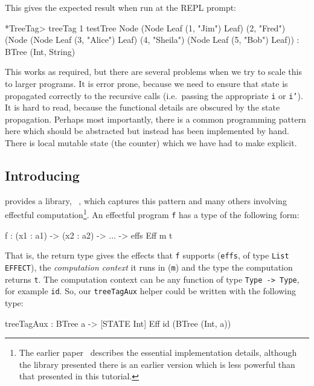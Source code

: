 \noindent
This gives the expected result when run at the \Idris{} REPL prompt:

\begin{code}
*TreeTag> treeTag 1 testTree 
Node (Node Leaf (1, "Jim") Leaf)
     (2, "Fred")
     (Node (Node Leaf (3, "Alice") Leaf)
           (4, "Sheila")
           (Node Leaf (5, "Bob") Leaf)) : BTree (Int, String)
\end{code}

\noindent
This works as required, but there are several problems when we try to scale this to larger programs.
It is error prone, because we need to ensure that state is propagated correctly to the recursive calls (i.e.\ passing the appropriate \texttt{i} or \texttt{i'}).
It is hard to read, because the functional details are obscured by the state propagation.
Perhaps most importantly, there is a common programming pattern here which should be abstracted but instead has been implemented by hand.
There is local mutable state (the counter) which we have had to make explicit.

\subsection{Introducing \effects{}}

\Idris{} provides a library, \effects{}~\cite{brady-icfp2013}, which captures this pattern and many others involving effectful computation\footnote{The earlier paper~\cite{brady-icfp2013} describes the essential implementation details, although the library presented there is an earlier version which is less powerful than that presented in this tutorial.}.
An effectful program \texttt{f} has a type of the following form:

\begin{code}
f : (x1 : a1) -> (x2 : a2) -> ... -> { effs } Eff m t
\end{code}

\noindent
That is, the return type gives the effects that \texttt{f} supports (\texttt{effs}, of type \texttt{List EFFECT}),  the \emph{computation context} it runs in (\texttt{m}) and the type the computation returns \texttt{t}.
The computation context can be any function of type \texttt{Type -> Type}, for example \texttt{id}.
So, our \texttt{treeTagAux} helper could be written with the following type:

\begin{code}
treeTagAux : BTree a -> { [STATE Int] } Eff id (BTree (Int, a))
\end{code}

